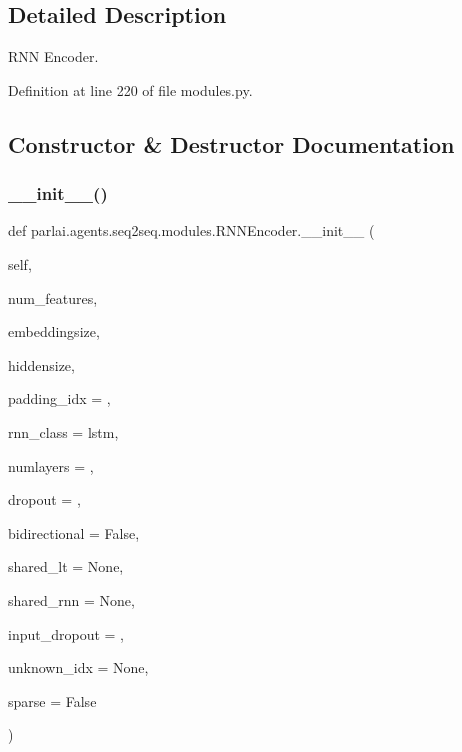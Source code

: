 \subsection{Detailed Description}
\begin{DoxyVerb}RNN Encoder.\end{DoxyVerb}
 

Definition at line 220 of file modules.\+py.



\subsection{Constructor \& Destructor Documentation}
\mbox{\label{classparlai_1_1agents_1_1seq2seq_1_1modules_1_1RNNEncoder_a16b286b0c62255fe349789ea576afdb0}} 
\subsubsection{\texorpdfstring{\+\_\+\+\_\+init\+\_\+\+\_\+()}{\_\_init\_\_()}}
{\footnotesize\ttfamily def parlai.\+agents.\+seq2seq.\+modules.\+R\+N\+N\+Encoder.\+\_\+\+\_\+init\+\_\+\+\_\+ (\begin{DoxyParamCaption}\item[{}]{self,  }\item[{}]{num\+\_\+features,  }\item[{}]{embeddingsize,  }\item[{}]{hiddensize,  }\item[{}]{padding\+\_\+idx = {},  }\item[{}]{rnn\+\_\+class = {\ttfamily \textquotesingle{}lstm\textquotesingle{}},  }\item[{}]{numlayers = {},  }\item[{}]{dropout = {},  }\item[{}]{bidirectional = {\ttfamily False},  }\item[{}]{shared\+\_\+lt = {\ttfamily None},  }\item[{}]{shared\+\_\+rnn = {\ttfamily None},  }\item[{}]{input\+\_\+dropout = {},  }\item[{}]{unknown\+\_\+idx = {\ttfamily None},  }\item[{}]{sparse = {\ttfamily False} }\end{DoxyParamCaption})}

